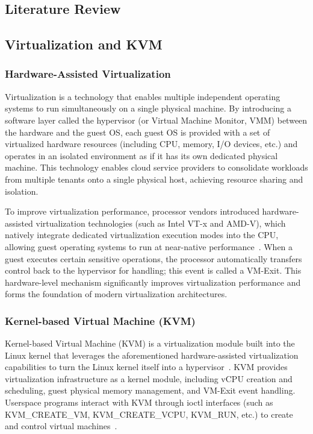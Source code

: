 \begin{ZhChapter}

\chapter{Literature Review}
\label{ch:literature}

\section{Virtualization and KVM}
\label{sec:virtualization-kvm}

\subsection{Hardware-Assisted Virtualization}
\label{sec:hw-virt}

Virtualization is a technology that enables multiple independent operating systems to run simultaneously on a single physical machine. By introducing a software layer called the hypervisor (or Virtual Machine Monitor, VMM) between the hardware and the guest OS, each guest OS is provided with a set of virtualized hardware resources (including CPU, memory, I/O devices, etc.) and operates in an isolated environment as if it has its own dedicated physical machine. This technology enables cloud service providers to consolidate workloads from multiple tenants onto a single physical host, achieving resource sharing and isolation.

To improve virtualization performance, processor vendors introduced hardware-assisted virtualization technologies (such as Intel VT-x and AMD-V), which natively integrate dedicated virtualization execution modes into the CPU, allowing guest operating systems to run at near-native performance~\cite{IntelSDM}. When a guest executes certain sensitive operations, the processor automatically transfers control back to the hypervisor for handling; this event is called a VM-Exit. This hardware-level mechanism significantly improves virtualization performance and forms the foundation of modern virtualization architectures.

\subsection{Kernel-based Virtual Machine (KVM)}
\label{sec:kvm}

Kernel-based Virtual Machine (KVM) is a virtualization module built into the Linux kernel that leverages the aforementioned hardware-assisted virtualization capabilities to turn the Linux kernel itself into a hypervisor~\cite{Kivity2007}\cite{KVMAPI}. KVM provides virtualization infrastructure as a kernel module, including vCPU creation and scheduling, guest physical memory management, and VM-Exit event handling. Userspace programs interact with KVM through ioctl interfaces (such as KVM\_CREATE\_VM, KVM\_CREATE\_VCPU, KVM\_RUN, etc.) to create and control virtual machines~\cite{KVMAPI}.


\end{ZhChapter}
